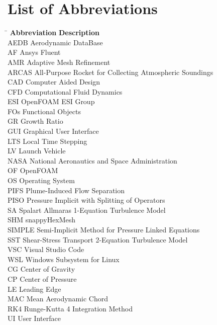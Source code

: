 \section*{List of Abbreviations}
\begin{tabbing}
    \hspace{3cm} \= \hspace{8cm} \kill
    \textbf{Abbreviation} \> \textbf{Description} \\
    AEDB \> Aerodynamic DataBase  \\
    AF \> Ansys Fluent \\
    AMR \> Adaptive Mesh Refinement \\
    ARCAS \> All-Purpose Rocket for Collecting Atmospheric Soundings \\
    CAD \> Computer Aided Design \\
    CFD \> Computational Fluid Dynamics \\
    ESI \> OpenFOAM ESI Group \\
    FOs \> Functional Objects \\
    GR \> Growth Ratio \\
    GUI \> Graphical User Interface \\
    LTS \> Local Time Stepping \\
    LV \> Launch Vehicle \\
    NASA \> National Aeronautics and Space Administration \\
    OF \> OpenFOAM \\
    OS \> Operating System \\
    PIFS \> Plume-Induced Flow Separation \\
    PISO \> Pressure Implicit with Splitting of Operators \\
    SA \> Spalart Allmaras 1-Equation Turbulence Model \\
    SHM \> snappyHexMesh \\
    SIMPLE \> Semi-Implicit Method for Pressure Linked Equations \\
    SST \> Shear-Stress Transport 2-Equation Turbulence Model \\
    VSC \> Visual Studio Code \\
    WSL \> Windows Subsystem for Linux \\
    CG \> Center of Gravity \\
    CP \> Center of Pressure \\
    LE \> Leading Edge \\
    MAC \> Mean Aerodynamic Chord \\
    RK4 \> Runge-Kutta 4 Integration Method \\
    UI \> User Interface
\end{tabbing}
%
